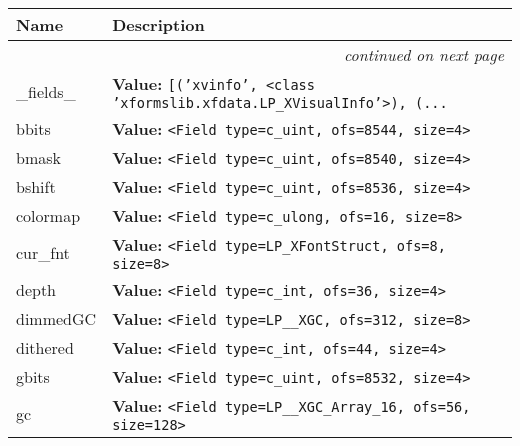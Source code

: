     \vspace{-1cm}
\hspace{\varindent}\begin{longtable}{|p{\varnamewidth}|p{\vardescrwidth}|l}
\cline{1-2}
\cline{1-2} \centering \textbf{Name} & \centering \textbf{Description}& \\
\cline{1-2}
\endhead\cline{1-2}\multicolumn{3}{r}{\small\textit{continued on next page}}\\\endfoot\cline{1-2}
\endlastfoot\raggedright \_\-f\-i\-e\-l\-d\-s\-\_\- & \raggedright \textbf{Value:} 
{\tt \texttt{[}\texttt{(}\texttt{'}\texttt{xvinfo}\texttt{'}\texttt{, }{\textless}class 'xformslib.xfdata.LP\_XVisualInfo'{\textgreater}\texttt{)}\texttt{, }\texttt{(}\texttt{...}}&\\
\cline{1-2}
\raggedright b\-b\-i\-t\-s\- & \raggedright \textbf{Value:} 
{\tt {\textless}Field type=c\_uint, ofs=8544, size=4{\textgreater}}&\\
\cline{1-2}
\raggedright b\-m\-a\-s\-k\- & \raggedright \textbf{Value:} 
{\tt {\textless}Field type=c\_uint, ofs=8540, size=4{\textgreater}}&\\
\cline{1-2}
\raggedright b\-s\-h\-i\-f\-t\- & \raggedright \textbf{Value:} 
{\tt {\textless}Field type=c\_uint, ofs=8536, size=4{\textgreater}}&\\
\cline{1-2}
\raggedright c\-o\-l\-o\-r\-m\-a\-p\- & \raggedright \textbf{Value:} 
{\tt {\textless}Field type=c\_ulong, ofs=16, size=8{\textgreater}}&\\
\cline{1-2}
\raggedright c\-u\-r\-\_\-f\-n\-t\- & \raggedright \textbf{Value:} 
{\tt {\textless}Field type=LP\_XFontStruct, ofs=8, size=8{\textgreater}}&\\
\cline{1-2}
\raggedright d\-e\-p\-t\-h\- & \raggedright \textbf{Value:} 
{\tt {\textless}Field type=c\_int, ofs=36, size=4{\textgreater}}&\\
\cline{1-2}
\raggedright d\-i\-m\-m\-e\-d\-G\-C\- & \raggedright \textbf{Value:} 
{\tt {\textless}Field type=LP\_\_XGC, ofs=312, size=8{\textgreater}}&\\
\cline{1-2}
\raggedright d\-i\-t\-h\-e\-r\-e\-d\- & \raggedright \textbf{Value:} 
{\tt {\textless}Field type=c\_int, ofs=44, size=4{\textgreater}}&\\
\cline{1-2}
\raggedright g\-b\-i\-t\-s\- & \raggedright \textbf{Value:} 
{\tt {\textless}Field type=c\_uint, ofs=8532, size=4{\textgreater}}&\\
\cline{1-2}
\raggedright g\-c\- & \raggedright \textbf{Value:} 
{\tt {\textless}Field type=LP\_\_XGC\_Array\_16, ofs=56, size=128{\textgreater}}&\\

\end{longtable}
